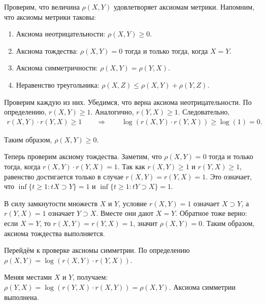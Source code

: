 \documentclass[../main.tex]{subfiles}
\begin{document}
Проверим, что величина $ \rho (X, Y)$ удовлетворяет аксиомам метрики. 
Напомним, что аксиомы метрики таковы:
\begin{enumerate}
	\item Аксиома неотрицательности: $\rho(X,Y) \geqslant 0$.
	\item Аксиома тождества: $\rho(X,Y) = 0 $ тогда и только тогда, когда $X = Y$.
	\item Аксиома симметричности: $ \rho(X,Y) = \rho(Y,X) $.
	\item Неравенство треугольника: $ \rho(X,Z) \leqslant \rho(X,Y) + \rho(Y,Z) $.
\end{enumerate}

Проверим каждую из них. 
Убедимся, что верна аксиома неотрицательности. 
По определению, $r(X,Y) \geqslant 1$. 
Аналогично, $ r(Y,X) \geqslant 1 $. 
Следовательно, 
\begin{gather*}
	r(X,Y)\cdot r(Y,X) \geqslant 1 \qquad \Rightarrow \qquad
	 \log(r(X,Y) \cdot r(Y,X)) \geqslant \log(1) = 0.
\end{gather*}

Таким образом, $ \rho(X,Y) \geqslant 0 $.


Теперь проверим аксиому тождества.
Заметим, что $\rho(X,Y) = 0 $ тогда и только тогда, когда $ r(X,Y) \cdot r(Y,X) = 1$.
Так как $r(X,Y) \geqslant 1 $ и $r(Y,X) \geqslant 1 $, равенство достигается только в случае $r(X,Y) = r(Y,X) = 1 $.
Это означает, что $\inf\{t \geqslant 1 : tX \supset Y \} = 1$ и $\inf\{t \geqslant 1 : tY \supset X \} = 1$.

В силу замкнутости множеств $X$ и $Y$, условие $ r(X,Y)=1$ означает $X \supset Y$, а $r(Y,X)=1$ означает $Y \supset X$. 
Вместе они дают $X=Y$.
Обратное тоже верно: если $X=Y$, то $r(X,Y)=r(Y,X)=1$, значит $\rho(X,Y)=0$.
Таким образом, аксиома тождества выполняется.

Перейдём к проверке аксиомы симметрии. 
По определению 	$\rho(X,Y)= \log(r(X,Y) \cdot r(Y,X))$.

Меняя местами $X$ и $Y$, получаем:
$\rho(Y, X) = \log(r(Y,X) \cdot r(X,Y))=\rho(X,Y).$
Аксиома симметрии выполнена.
\end{document}
